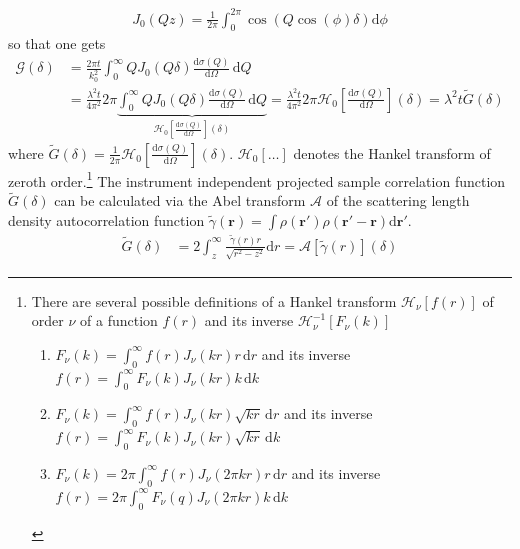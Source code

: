 \begin{align}
J_0(Qz)=\frac{1}{2\pi}\int_{0}^{2\pi} \cos\left(Q\cos(\phi)\delta\right) \mathrm{d}\phi
\end{align}
so that one gets
\begin{align}
\mathcal{G}(\delta) &= \frac{2\pi t}{k_0^2} \int_{0}^{\infty} Q J_0(Q\delta) \frac{\mathrm{d}\sigma(Q)}{\mathrm{d}\Omega} \, \mathrm{d}Q \\
&= \frac{\lambda^2 t}{4\pi^2} 2\pi\underbrace{\int_{0}^{\infty} Q J_0(Q\delta) \frac{\mathrm{d}\sigma(Q)}{\mathrm{d}\Omega} \, \mathrm{d}Q}_{\mathcal{H}_0\left[\frac{\mathrm{d}\sigma(Q)}{\mathrm{d}\Omega}\right](\delta)} = \frac{\lambda^2 t}{4\pi^2}  2\pi \mathcal{H}_0\left[\frac{\mathrm{d}\sigma(Q)}{\mathrm{d}\Omega}\right](\delta)
= \lambda^2 t \tilde{G}(\delta)
\end{align}
where $\tilde{G}(\delta)=\frac{1}{2\pi}\mathcal{H}_0\left[\frac{\mathrm{d}\sigma(Q)}{\mathrm{d}\Omega}\right](\delta)$. $\mathcal{H}_0\left[\ldots\right]$ denotes the Hankel transform of zeroth order.\footnote{\label{footnote:Hankel}
There are several possible definitions of a Hankel transform $\mathcal{H}_\nu\left[f(r)\right]$ of order $\nu$ of a function $f(r)$ and its inverse $\mathcal{H}_\nu^{-1}\left[F_\nu(k)\right]$
\begin{enumerate}
\item $F_\nu(k) = \int_0^\infty f(r) J_\nu(kr) r \,\mathrm{d}r$ and its inverse $f(r)=\int_0^\infty F_\nu(k)J_\nu(kr) k \,\mathrm{d}k$
\item $F_\nu(k) = \int_0^\infty f(r) J_\nu(kr) \sqrt{kr} \,\mathrm{d}r$ and its inverse $f(r)=\int_0^\infty F_\nu(k)J_\nu(kr)  \sqrt{kr}  \, \mathrm{d}k$
\item $F_\nu(k) = 2\pi \int_0^\infty f(r) J_\nu(2\pi kr) r \,\mathrm{d}r$ and its inverse $f(r)=2\pi \int_0^\infty F_\nu(q)J_\nu(2\pi kr) k \,\mathrm{d}k$
\end{enumerate}
}
The instrument independent projected sample correlation function $\tilde{G}(\delta)$ can be calculated via the Abel transform $\mathcal{A}$ of the scattering length density autocorrelation function $\tilde{\gamma}(\mathbf{r})=\int \rho(\mathbf{r'})\rho(\mathbf{r'-r})\mathrm{d}\mathbf{r'}$.
\begin{align}
\tilde{G}(\delta) &= 2 \int_z^\infty \frac{\tilde{\gamma}(r) r}{\sqrt{r^2-z^2}} \mathrm{d}r = \mathcal{A}\left[\tilde{\gamma}(r)\right](\delta)
\end{align}
